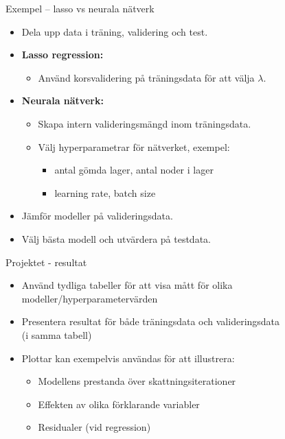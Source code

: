 \documentclass[10pt,english]{beamer}
\begin{document}
\begin{frame}{Exempel – lasso vs neurala nätverk}
\begin{itemize}
    \item Dela upp data i träning, validering och test.
    \item \textbf{Lasso regression:}
    \begin{itemize}
        \item Använd korsvalidering på träningsdata för att välja $\lambda$.
    \end{itemize}
    \item \textbf{Neurala nätverk:}
    \begin{itemize}
        \item Skapa intern valideringsmängd inom träningsdata.
        \item Välj hyperparametrar för nätverket, exempel:
        \begin{itemize}
          \item antal gömda lager, antal noder i lager
          \item learning rate, batch size
        \end{itemize}
    \end{itemize}
    \item Jämför modeller på valideringsdata.
    \item Välj bästa modell och utvärdera på testdata.
\end{itemize}
\end{frame}


\begin{frame}{Projektet - resultat}
\begin{itemize}
    \item Använd tydliga tabeller för att visa mått för olika modeller/hyperparametervärden
    \item Presentera resultat för både träningsdata och valideringsdata \\ (i samma tabell)
    \item Plottar kan exempelvis användas för att illustrera:
    \begin{itemize}
        \item Modellens prestanda över skattningsiterationer
        \item Effekten av olika förklarande variabler
        \item Residualer (vid regression)
    \end{itemize}
\end{itemize}
\end{frame}
\end{document}
